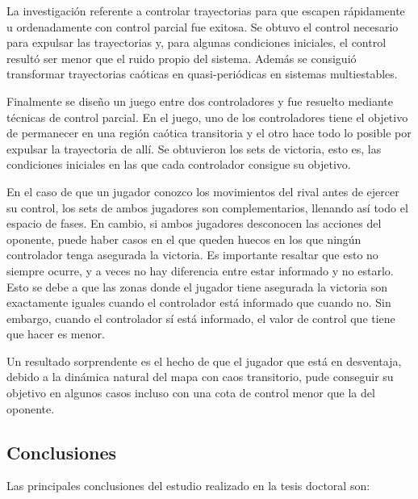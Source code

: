 La investigación referente a controlar trayectorias para que escapen rápidamente u ordenadamente con control parcial fue exitosa. Se obtuvo el control necesario para expulsar las trayectorias y, para algunas condiciones iniciales, el control resultó ser menor que el ruido propio del sistema. Además se consiguió transformar trayectorias caóticas en quasi-periódicas en sistemas multiestables.

Finalmente se diseño un juego entre dos controladores y fue resuelto mediante técnicas de control parcial. En el juego, uno de los controladores tiene el objetivo de permanecer en una región caótica transitoria y el otro hace todo lo posible por expulsar la trayectoria de allí. Se obtuvieron los sets de victoria, esto es, las condiciones iniciales en las que cada controlador consigue su objetivo.

En el caso de que un jugador conozco los movimientos del rival antes de ejercer su control, los sets de ambos jugadores son complementarios, llenando así todo el espacio de fases. En cambio, si ambos jugadores desconocen las acciones del oponente, puede haber casos en el que queden huecos en los que ningún controlador tenga asegurada la victoria. Es importante resaltar que esto no siempre ocurre, y a veces no hay diferencia entre estar informado y no estarlo. Esto se debe a que las zonas donde el jugador tiene asegurada la victoria son exactamente iguales cuando el controlador está informado que cuando no. Sin embargo, cuando el controlador sí está informado, el valor de control que tiene que hacer es menor.

Un resultado sorprendente es el hecho de que el jugador que está en desventaja, debido a la dinámica natural del mapa con caos transitorio, pude conseguir su objetivo en algunos casos incluso con una cota de control menor que la del oponente.

\subsection{Conclusiones}

Las principales conclusiones del estudio realizado en la tesis doctoral son:


